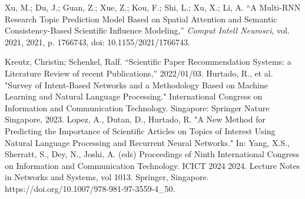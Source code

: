 \documentclass[runningheads]{llncs}
\begin{document}
\begin{thebibliography}{00}
    Xu, M.; Du, J.; Guan, Z.; Xue, Z.; Kou, F.; Shi, L.; Xu, X.; Li, A. 
    ``A Multi-RNN Research Topic Prediction Model Based on Spatial Attention and Semantic Consistency-Based Scientific Influence Modeling,'' 
    \emph{Comput Intell Neurosci}, 
    vol. 2021, 
    2021, 
    p. 1766743, 
    doi: 10.1155/2021/1766743.
    
    Kreutz, Christin; Schenkel, Ralf.
    ``Scientific Paper Recommendation Systems: a Literature Review of recent Publications,''
    2022/01/03.
	 Hurtado, R., et al. "Survey of Intent-Based Networks and a Methodology Based on Machine Learning and Natural Language Processing." International Congress on Information and Communication Technology. Singapore: Springer Nature Singapore, 2023.
     Lopez, A., Dutan, D., Hurtado, R. "A New Method for Predicting the Importance of Scientific Articles on Topics of Interest Using Natural Language Processing and Recurrent Neural Networks." In: Yang, X.S., Sherratt, S., Dey, N., Joshi, A. (eds) Proceedings of Ninth International Congress on Information and Communication Technology. ICICT 2024 2024. Lecture Notes in Networks and Systems, vol 1013. Springer, Singapore. https://doi.org/10.1007/978-981-97-3559-4\_50.
\end{thebibliography}
\end{document}
